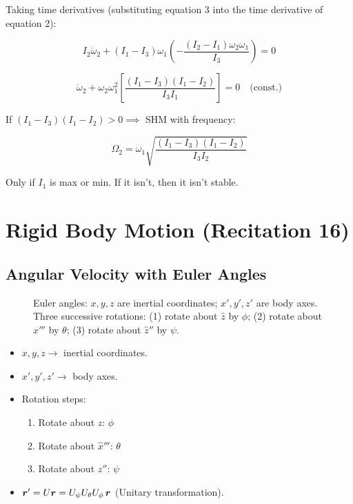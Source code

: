 Taking time derivatives (substituting equation 3 into the time derivative of equation 2):

\[
    I_2\ddot{\omega}_2 + (I_1-I_3)\omega_1\left(-\frac{(I_2-I_1)\omega_2\omega_1}{I_3}\right) = 0
\]

\[
    \ddot{\omega}_2 + \omega_2\omega_1^2\left[\frac{(I_1-I_3)(I_1-I_2)}{I_3 I_1}\right] = 0
    \quad\text{(const.)}
\]

If $(I_1-I_3)(I_1-I_2) > 0 \implies$ SHM with frequency:

\[
    \Omega_2 = \omega_1\sqrt{\frac{(I_1-I_3)(I_1-I_2)}{I_3 I_2}}
\]

Only if $I_1$ is max or min. If it isn't, then it isn't stable.

\section{Rigid Body Motion (Recitation 16)}


\subsection{Angular Velocity with Euler Angles}

\begin{figure}[H]
    \centering
    \caption{Euler angles: $x,y,z$ are inertial coordinates; $x',y',z'$ are body axes. Three successive rotations: (1) rotate about $\hat{z}$ by $\phi$; (2) rotate about $\hat{x}'''$ by $\theta$; (3) rotate about $\hat{z}''$ by $\psi$.}
\end{figure}

\begin{itemize}
    \item $x,y,z \to$ inertial coordinates.
    \item $x',y',z' \to$ body axes.
    \item Rotation steps:
    \begin{enumerate}
        \item Rotate about $\hat{z}$: $\phi$
        \item Rotate about $\hat{x}'''$: $\theta$
        \item Rotate about $\hat{z}''$: $\psi$
    \end{enumerate}
    \item $\bm{r}' = U\bm{r} = U_\psi U_\theta U_\phi\,\bm{r}$ (Unitary transformation).
\end{itemize}

